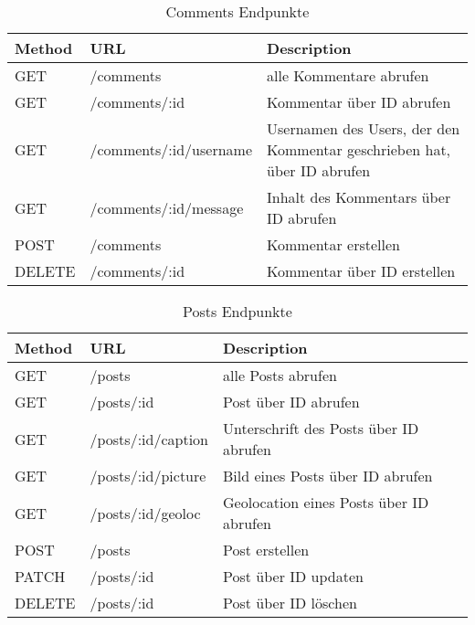 \begin{table}[!htb]
    \begin{tabularx}{\textwidth}{|X|X|X|}
        \hline
        \textbf{Method} & \textbf{URL} & \textbf{Description} \\
        \hline
        \hline

    GET & /comments & alle Kommentare abrufen\\
    \hline
    GET & /comments/:id & Kommentar über ID abrufen\\
    \hline
    GET & /comments/:id/username & Usernamen des Users, der den Kommentar geschrieben hat, über ID abrufen\\
    \hline
    GET & /comments/:id/message & Inhalt des Kommentars über ID abrufen\\
    \hline
    POST & /comments & Kommentar erstellen\\
    \hline
    DELETE & /comments/:id & Kommentar über ID erstellen\\
    \hline
\end{tabularx}
\caption{Comments Endpunkte}
\label{commentsendpunkte}
\end{table}

\begin{table}[!htb]
    \begin{tabularx}{\textwidth}{|X|X|X|}
        \hline
        \textbf{Method} & \textbf{URL} & \textbf{Description} \\
        \hline
        \hline
    GET & /posts & alle Posts abrufen\\
    \hline
    GET & /posts/:id & Post über ID abrufen\\
    \hline
    GET & /posts/:id/caption & Unterschrift des Posts über ID abrufen\\
    \hline
    GET & /posts/:id/picture & Bild eines Posts über ID abrufen\\
    \hline
    GET & /posts/:id/geoloc & Geolocation eines Posts über ID abrufen\\
    \hline
    POST & /posts & Post erstellen\\
    \hline
    PATCH & /posts/:id & Post über ID updaten\\
    \hline
    DELETE & /posts/:id & Post über ID löschen\\
    \hline
\end{tabularx}
\caption{Posts Endpunkte}
\label{postsendpunkte}
\end{table}

